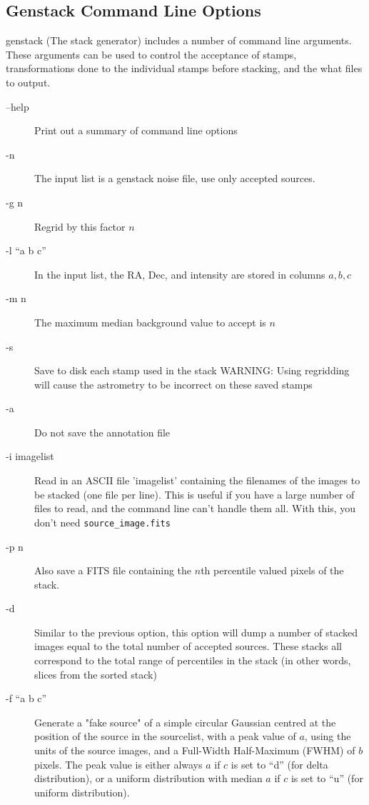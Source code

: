 \documentclass{article}
\begin{document}
\subsection{Genstack Command Line Options}
genstack (The stack generator) includes a number of command line arguments.  
These arguments can be used to control the acceptance of stamps, transformations
done to the individual stamps before stacking, and the what files to output.
\begin{description}
	\item[--help]  Print out a summary of command line options
	\item[-n] The input list is a genstack noise file, use only accepted sources.
	\item[-g n] Regrid by this factor $n$
	\item[-l ``a b c'']  In the input list, the RA, Dec, and intensity are stored in columns $a,b,c$
	\item[-m n] The maximum median background value to accept is $n$
	\item[-s] Save to disk each stamp used in the stack WARNING: Using 
	regridding will cause the astrometry to be incorrect on these saved stamps
	\item[-a] Do not save the annotation file
	\item[-i imagelist] Read in an ASCII file 'imagelist' containing the 
	filenames of the images to be stacked (one file per line). This is
	useful if you have a large number of files to read, and the command line
	can't handle them all.  With this, you don't need 
	\verb!source_image.fits!
	\item[-p n] Also save a FITS file containing the $n$th percentile valued 
	pixels of the stack.
	\item[-d] Similar to the previous option, this option will dump a number of
	stacked images equal to the total number of accepted sources.  These stacks
	all correspond to the total range of percentiles in the stack (in other 
	words, slices from the sorted stack)
	\item[-f ``a b c''] Generate a "fake source" of a simple circular Gaussian 
	centred at the position of the source in the sourcelist, with a peak value 
	of $a$, using the units of the source images, and a Full-Width Half-Maximum		(FWHM) of $b$ pixels.  The peak value is either always $a$ if $c$ is set to
	``d'' (for delta distribution), or a uniform distribution with median $a$ if
	$c$ is set to ``u'' (for uniform distribution).
\end{description}
\end{document}
